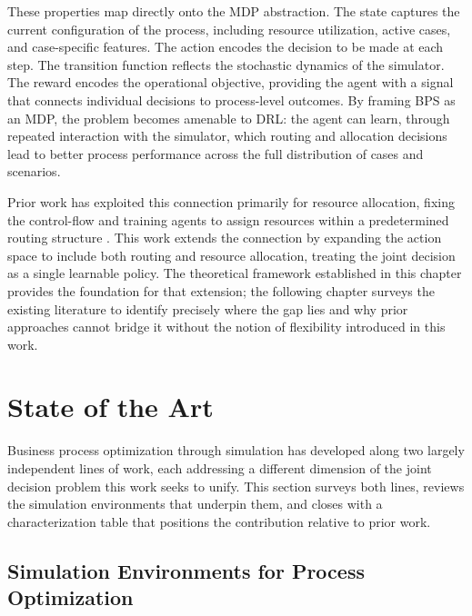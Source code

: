 \documentclass[journal,onecolumn]{IEEEtran}
\begin{document}
These properties map directly onto the MDP abstraction. The state captures
the current configuration of the process, including resource utilization,
active cases, and case-specific features. The action encodes the decision to
be made at each step. The transition function reflects the stochastic
dynamics of the simulator. The reward encodes the operational objective,
providing the agent with a signal that connects individual decisions to
process-level outcomes. By framing BPS as an MDP, the problem becomes
amenable to DRL: the agent can learn, through repeated interaction with the
simulator, which routing and allocation decisions lead to better process
performance across the full distribution of cases and scenarios.

Prior work has exploited this connection primarily for resource allocation,
fixing the control-flow and training agents to assign resources within a
predetermined routing structure
\cite{Optimizing_Resource_Allocation_Policies, Learning_policies_drl,
Resource_allocation_using_task_similarity}. This work extends the connection
by expanding the action space to include both routing and resource allocation,
treating the joint decision as a single learnable policy. The theoretical
framework established in this chapter provides the foundation for that
extension; the following chapter surveys the existing literature to identify
precisely where the gap lies and why prior approaches cannot bridge it without the notion of flexibility introduced in this work.

\section{State of the Art}
\label{sec:state_of_the_art}

Business process optimization through simulation has developed along
two largely independent lines of work, each addressing a different
dimension of the joint decision problem this work seeks to unify.
This section surveys both lines, reviews the simulation environments
that underpin them, and closes with a characterization table that
positions the contribution relative to prior work.

\subsection{Simulation Environments for Process Optimization}
\label{subsec:soa_environments}
\end{document}
